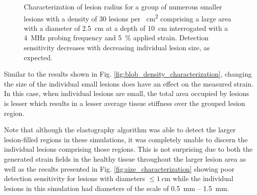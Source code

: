 			\begin{figure}[!t]
				\centering
				\caption[Quasi-static clustered lesion radius characterization]{Characterization of lesion radius for a group of numerous smaller lesions with a density of 30 lesions per \SI{}{cm^2} comprising a large area with a diameter of \SI{2.5}{\cm} at a depth of \SI{10}{\cm} interrogated with a \SI{4}{\MHz} probing frequency and \SI{5}{\percent} applied strain. Detection sensitivity decreases with decreasing individual lesion size, as expected.}
				\label{fig:blob_radius_characterization}
			\end{figure}

			Similar to the results shown in Fig. \ref{fig:blob_density_characterization}, changing the size of the individual small lesions does have an effect on the measured strain. In this case, when individual lesions are small, the total area occupied by lesions is lesser which results in a lesser average tissue stiffness over the grouped lesion region.

			Note that although the elastography algorithm was able to detect the larger lesion-filled regions in these simulations, it was completely unable to discern the individual lesions comprising those regions. This is not surprising due to both the generated strain fields in the healthy tissue throughout the larger lesion area as well as the results presented in Fig. \ref{fig:size_characterization} showing poor detection sensitivity for lesions with diameters $\leq \SI{1}{\cm}$ while the individual lesions in this simulation had diameters of the scale of \SI{0.5}{\mm} -- \SI{1.5}{\mm}.

